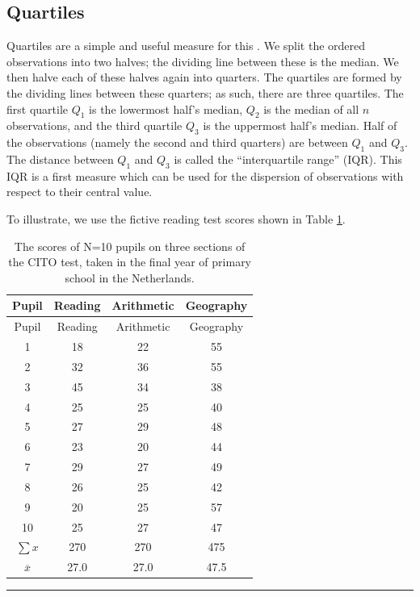 \documentclass[
]{book}
\begin{document}
\hypertarget{quartiles}{%
\subsection{Quartiles}\label{quartiles}}

Quartiles are a simple and useful measure for this \citep{Tukey77}.
We split the ordered observations into two halves; the dividing line
between these is the median. We then halve each of these halves again into quarters.
The quartiles are formed by the dividing lines between these
quarters; as such, there are three quartiles. The first quartile \(Q_1\) is the lowermost half's median,
\(Q_2\) is the median of all \(n\) observations, and the third quartile \(Q_3\) is the uppermost half's median.
Half of the observations (namely the second and third quarters) are
between \(Q_1\) and \(Q_3\). The distance between \(Q_1\) and \(Q_3\) is
called the ``interquartile range'' (IQR). This IQR is a first measure which
can be used for the dispersion of observations with respect to their
central value.

To illustrate, we use the fictive reading test scores shown in Table
\ref{tab:cito}.

\begin{longtable}[]{@{}cccc@{}}
\caption{\label{tab:cito} The scores of N=10 pupils on three sections of the CITO test,
taken in the final year of primary school in the Netherlands.}\tabularnewline
\toprule
Pupil & Reading & Arithmetic & Geography \\
\midrule
\endfirsthead
\toprule
Pupil & Reading & Arithmetic & Geography \\
\midrule
\endhead
1 & 18 & 22 & 55 \\
2 & 32 & 36 & 55 \\
3 & 45 & 34 & 38 \\
4 & 25 & 25 & 40 \\
5 & 27 & 29 & 48 \\
6 & 23 & 20 & 44 \\
7 & 29 & 27 & 49 \\
8 & 26 & 25 & 42 \\
9 & 20 & 25 & 57 \\
10 & 25 & 27 & 47 \\
\(\sum x\) & 270 & 270 & 475 \\
\(\overline{x}\) & 27.0 & 27.0 & 47.5 \\
\bottomrule
\end{longtable}

\begin{center}\rule{0.5\linewidth}{0.5pt}\end{center}
\end{document}
